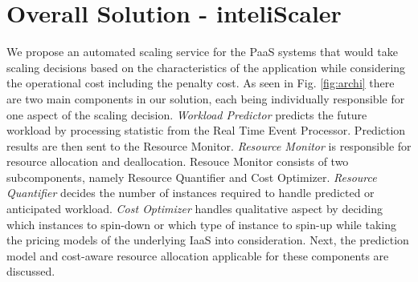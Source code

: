 \section{Overall Solution - inteliScaler}
We propose an automated scaling service for the PaaS systems that would take scaling decisions based on the characteristics of the application while considering the operational cost including the penalty cost. As seen in Fig. \ref{fig:archi} there are two main components in our solution, each being individually responsible for one aspect of the scaling decision. \textit{Workload Predictor} predicts the future workload by processing statistic from the Real Time Event Processor. Prediction results are then sent to the Resource Monitor. \textit{Resource Monitor} is responsible for resource allocation and deallocation. Resouce Monitor consists of two subcomponents, namely Resource Quantifier and Cost Optimizer. \textit{Resource Quantifier} decides the number of instances required to handle predicted or anticipated workload. \textit{Cost Optimizer} handles qualitative aspect by deciding which instances to spin-down or which type of instance to spin-up while taking the pricing models of the underlying IaaS into consideration. Next, the prediction model and cost-aware resource allocation applicable for these components are discussed.
